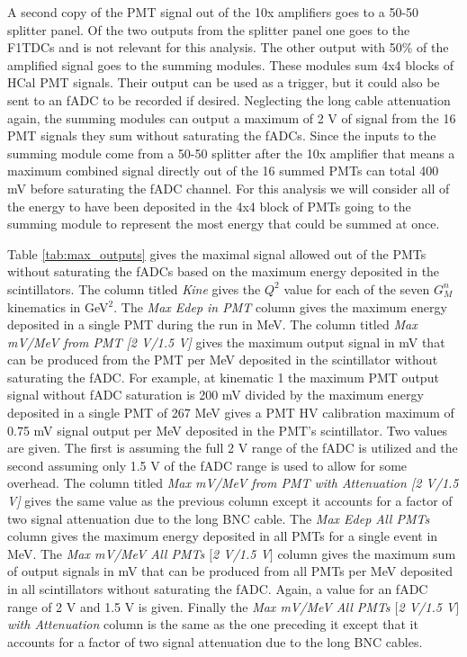 \documentclass[10pt]{article}
\begin{document}
	A second copy of the PMT signal out of the 10x amplifiers goes to a 50-50 splitter panel. Of the two outputs from the splitter panel one goes to the F1TDCs and is not relevant for this analysis. The other output with 50\% of the amplified signal goes to the summing modules. These modules sum 4x4 blocks of HCal PMT signals. Their output can be used as a trigger, but it could also be sent to an fADC to be recorded if desired. Neglecting the long cable attenuation again, the summing modules can output a maximum of 2 V of signal from the 16 PMT signals they sum without saturating the fADCs. Since the inputs to the summing module come from a 50-50 splitter after the 10x amplifier that means a maximum combined signal directly out of the 16 summed PMTs can total 400 mV before saturating the fADC channel. For this analysis we will consider all of the energy to have been deposited in the 4x4 block of PMTs going to the summing module to represent the most energy that could be summed at once. 
	\vspace{3mm}
	
	Table \ref{tab:max_outputs} gives the maximal signal allowed out of the PMTs without saturating the fADCs based on the maximum energy deposited in the scintillators. The column titled \textit{Kine} gives the $Q^2$ value for each of the seven $G_M^n$ kinematics in GeV$^2$. The \textit{Max Edep in PMT} column gives the maximum energy deposited in a single PMT during the run in MeV. The column titled \textit{Max mV/MeV from PMT [2 V/1.5 V]} gives the maximum output signal in mV that can be produced from the PMT per MeV deposited in the scintillator without saturating the fADC. For example, at kinematic 1 the maximum PMT output signal without fADC saturation is 200 mV divided by the maximum energy deposited in a single PMT of 267 MeV gives a PMT HV calibration maximum of 0.75 mV signal output per MeV deposited in the PMT's scintillator.  Two values are given. The first is assuming the full 2 V range of the fADC is utilized and the second assuming only 1.5 V of the fADC range is used to allow for some overhead. The column titled \textit{Max mV/MeV from PMT with Attenuation [2 V/1.5 V]} gives the same value as the previous column except it accounts for a factor of two signal attenuation due to the long BNC cable. The \textit{Max Edep All PMTs} column gives the maximum energy deposited in all PMTs for a single event in MeV. The \textit{Max mV/MeV All PMTs $[$2 V/1.5 V$]$} column gives the maximum sum of output signals in mV that can be produced from all PMTs per MeV deposited in all scintillators without saturating the fADC. Again, a value for an fADC range of 2 V and 1.5 V is given. Finally the \textit{Max mV/MeV All PMTs $[$2 V/1.5 V$]$ with Attenuation} column is the same as the one preceding it except that it accounts for a factor of two signal attenuation due to the long BNC cables.
	
\end{document}
